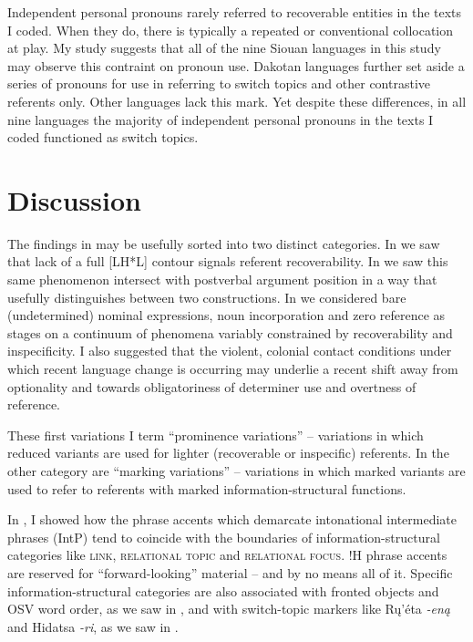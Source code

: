 \documentclass[output=paper]{LSP/langsci}
\begin{document}
	Independent personal pronouns rarely referred to recoverable entities in the texts I coded. When they do, there is typically a repeated or conventional collocation at play. My study suggests that all of the nine Siouan languages in this study may observe this contraint on pronoun use. Dakotan languages further set aside a series of pronouns for use in referring to switch topics and other contrastive referents only. Other languages lack this mark. Yet despite these differences, in all nine languages the majority of independent personal pronouns in the texts I coded functioned as switch topics.

\section{Discussion}\label{discussion}

The findings in  may be usefully sorted into two distinct categories. In  we saw that lack of a full [LH*L] contour signals referent recoverability. In  we saw this same phenomenon intersect with postverbal argument position in a way that usefully distinguishes between two constructions. In  we considered bare (undetermined) nominal expressions, noun incorporation and zero reference as stages on a continuum of phenomena variably constrained by recoverability and inspecificity. I also suggested that the violent, colonial contact conditions under which recent language change is occurring may underlie a recent shift away from optionality and towards obligatoriness of determiner use and overtness of reference. 

These first variations I term “prominence variations” -- variations in which reduced variants are used for lighter (recoverable or inspecific) referents. In the other category are “marking variations” -- variations in which marked variants are used to refer to referents with marked information-structural functions. 

In , I showed how the phrase accents which demarcate intonational intermediate phrases (IntP) tend to coincide with the boundaries of information-structural categories like \textsc{link, relational topic} and \textsc{relational focus}. !H phrase accents are reserved for “forward-looking” material -- and by no means all of it. Specific information-structural categories are also associated with fronted objects and OSV word order, as we saw in , and with switch-topic markers like Rų’éta \emph{-eną} and Hidatsa \emph{-ri}, as we saw in .
\end{document}
